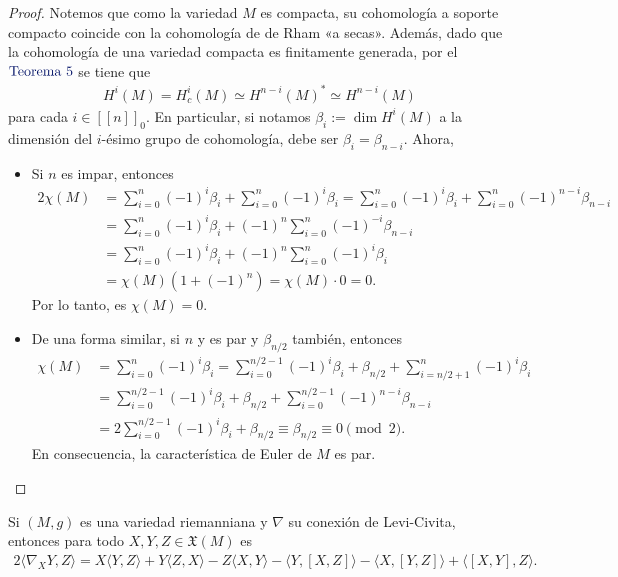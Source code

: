\documentclass[11pt]{article}
\newcommand{\X}{\mathfrak{X}}
\newcommand{\nat}[1]{[\![#1]\!]}
\newcommand{\natzero}[1]{\nat{#1}_0}
\newcommand{\ip}[1]{\langle #1 \rangle}
\newcommand{\paint}[1]{\color{color}{#1}}
\newcommand{\tpaing}[1]{\paint{\text{#1}}}
\newenvironment{theorem}[2][Teorema]{\begin{trivlist}
\item[\hskip \labelsep \paint{{\bfseries #1}}\hskip \labelsep {\bfseries #2.}]}{\end{trivlist}}
\begin{document}
\begin{proof} Notemos que como la variedad $M$ es compacta, su cohomología a soporte compacto coincide con la cohomología de de Rham «a secas». Además, dado que la cohomología de una variedad compacta es finitamente generada, por el $\tpaing{Teorema $5$}$ se tiene que
\begin{align*}
H^i(M) = H^i_c(M) \simeq H^{n-i}(M)^* \simeq H^{n-i}(M) 
\end{align*}
para cada $i \in \natzero{n}$. En particular, si notamos $\beta_i := \dim H^i(M)$ a la dimensión del $i$-ésimo grupo de cohomología, debe ser $\beta_i = \beta_{n-i}$.
Ahora,
\begin{itemize}[listparindent = \parindent]
\item[(a)] Si $n$ es impar, entonces
\begin{align*}
2\chi(M) &= \sum_{i=0}^{n}(-1)^i\beta_i + \sum_{i=0}^{n}(-1)^i\beta_i =
\sum_{i=0}^{n}(-1)^i\beta_i + \sum_{i=0}^{n}(-1)^{n-i}\beta_{n-i}\\
&= \sum_{i=0}^{n}(-1)^i\beta_i + (-1)^n\sum_{i=0}^{n}(-1)^{-i}\beta_{n-i}\\
&= \sum_{i=0}^{n}(-1)^i\beta_i + (-1)^n\sum_{i=0}^{n}(-1)^{i}\beta_{i}\\
&= \chi(M)(1 + (-1)^n) = \chi(M) \cdot  0 = 0.
\end{align*}
Por lo tanto, es $\chi(M) = 0$.
\item[(b)] De una forma similar, si $n$ y es par y $\beta_{n/2}$ también, entonces
\begin{align*}
\chi(M) &= \sum_{i=0}^{n}(-1)^i\beta_i = \sum_{i=0}^{n/2-1}(-1)^i\beta_i + \beta_{n/2} + \sum_{i=n/2+1}^{n}(-1)^i\beta_i\\
&= \sum_{i=0}^{n/2-1}(-1)^i\beta_i + \beta_{n/2} + \sum_{i=0}^{n/2-1}(-1)^{n-i}\beta_{n-i}\\
&= 2\sum_{i=0}^{n/2-1}(-1)^i\beta_i + \beta_{n/2} \equiv \beta_{n/2} \equiv 0 \pmod{2}.
\end{align*}
En consecuencia, la característica de Euler de $M$ es par.
\end{itemize}
\end{proof}

\begin{tcolorbox}
\begin{theorem}{6 (fórmula de Koszul)} Si $(M,g)$ es una variedad riemanniana y $\nabla$ su conexión de Levi-Civita, entonces para todo $X,Y,Z \in \X(M)$ es
\begin{align*}
2\ip{\nabla_XY,Z} = X\ip{Y,Z} + Y\ip{Z,X} - Z\ip{X,Y} - \ip{Y,[X,Z]} - \ip{X,[Y,Z]} + \ip{[X,Y],Z}.
\end{align*}
\end{theorem}
\ \\
\end{tcolorbox}
\end{document}
